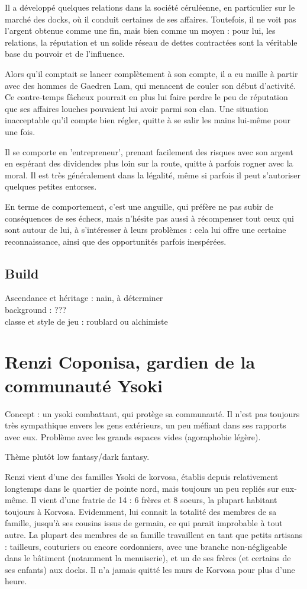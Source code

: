 \documentclass[10pt,a4paper]{book}
\begin{document}
Il a développé quelques relations dans la société céruléenne, en particulier sur le marché des docks, où il conduit certaines de ses affaires. Toutefois, il ne voit pas l'argent obtenue comme une fin, mais bien comme un moyen : pour lui, les relations, la réputation et un solide réseau de dettes contractées sont la véritable base du pouvoir et de l'influence.

Alors qu'il comptait se lancer complètement à son compte, il a eu maille à partir avec des hommes de Gaedren Lam, qui menacent de couler son début d'activité. Ce contre-temps fâcheux pourrait en plus lui faire perdre le peu de réputation que ses affaires louches pouvaient lui avoir parmi son clan. Une situation inacceptable qu'il compte bien régler, quitte à se salir les mains lui-même pour une fois.

Il se comporte en 'entrepreneur', prenant facilement des risques avec son argent en espérant des dividendes plus loin sur la route, quitte à parfois rogner avec la moral. Il est très généralement dans la légalité, même si parfois il peut s'autoriser quelques petites entorses.

En terme de comportement, c'est une anguille, qui préfère ne pas subir de conséquences de ses échecs, mais n'hésite pas aussi à récompenser tout ceux qui sont autour de lui, à s'intéresser à leurs problèmes : cela lui offre une certaine reconnaissance, ainsi que des opportunités parfois inespérées.
\subsection{Build}
Ascendance et héritage : nain, à déterminer\\
background : ???\\
classe et style de jeu : roublard ou alchimiste
\section{Renzi Coponisa, gardien de la communauté Ysoki}
Concept : un ysoki combattant, qui protège sa communauté. Il n'est pas toujours très sympathique envers les gens extérieurs, un peu méfiant dans ses rapports avec eux. Problème avec les grands espaces vides (agoraphobie légère).

Thème plutôt low fantasy/dark fantasy.

Renzi vient d'une des familles Ysoki de korvosa, établis depuis relativement longtemps dans le quartier de pointe nord, mais toujours un peu repliés sur eux-même. Il vient d'une fratrie de 14 : 6 frères et 8 soeurs, la plupart habitant toujours à Korvosa. Evidemment, lui connait la totalité des membres de sa famille, jusqu'à ses cousins issus de germain, ce qui parait improbable à tout autre. La plupart des membres de sa famille travaillent en tant que petits artisans : tailleurs, couturiers ou encore cordonniers,  avec une branche non-négligeable dans le bâtiment (notamment la menuiserie), et un de ses frères (et certains de ses enfants) aux docks. Il n'a jamais quitté les murs de Korvosa pour plus d'une heure.
\end{document}
